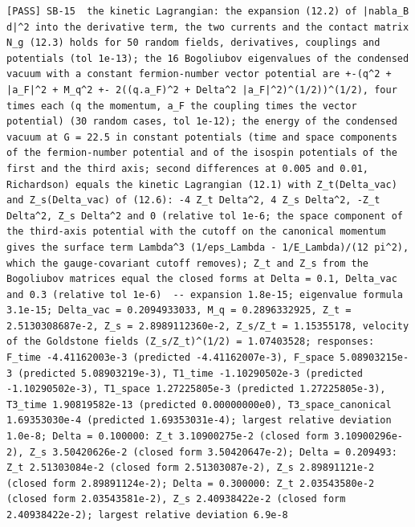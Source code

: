 \documentclass[
  10pt,
]{article}
\begin{document}
\begin{verbatim}
[PASS] SB-15  the kinetic Lagrangian: the expansion (12.2) of |nabla_B d|^2 into the derivative term, the two currents and the contact matrix N_g (12.3) holds for 50 random fields, derivatives, couplings and potentials (tol 1e-13); the 16 Bogoliubov eigenvalues of the condensed vacuum with a constant fermion-number vector potential are +-(q^2 + |a_F|^2 + M_q^2 +- 2((q.a_F)^2 + Delta^2 |a_F|^2)^(1/2))^(1/2), four times each (q the momentum, a_F the coupling times the vector potential) (30 random cases, tol 1e-12); the energy of the condensed vacuum at G = 22.5 in constant potentials (time and space components of the fermion-number potential and of the isospin potentials of the first and the third axis; second differences at 0.005 and 0.01, Richardson) equals the kinetic Lagrangian (12.1) with Z_t(Delta_vac) and Z_s(Delta_vac) of (12.6): -4 Z_t Delta^2, 4 Z_s Delta^2, -Z_t Delta^2, Z_s Delta^2 and 0 (relative tol 1e-6; the space component of the third-axis potential with the cutoff on the canonical momentum gives the surface term Lambda^3 (1/eps_Lambda - 1/E_Lambda)/(12 pi^2), which the gauge-covariant cutoff removes); Z_t and Z_s from the Bogoliubov matrices equal the closed forms at Delta = 0.1, Delta_vac and 0.3 (relative tol 1e-6)  -- expansion 1.8e-15; eigenvalue formula 3.1e-15; Delta_vac = 0.2094933033, M_q = 0.2896332925, Z_t = 2.5130308687e-2, Z_s = 2.8989112360e-2, Z_s/Z_t = 1.15355178, velocity of the Goldstone fields (Z_s/Z_t)^(1/2) = 1.07403528; responses: F_time -4.41162003e-3 (predicted -4.41162007e-3), F_space 5.08903215e-3 (predicted 5.08903219e-3), T1_time -1.10290502e-3 (predicted -1.10290502e-3), T1_space 1.27225805e-3 (predicted 1.27225805e-3), T3_time 1.90819582e-13 (predicted 0.00000000e0), T3_space_canonical 1.69353030e-4 (predicted 1.69353031e-4); largest relative deviation 1.0e-8; Delta = 0.100000: Z_t 3.10900275e-2 (closed form 3.10900296e-2), Z_s 3.50420626e-2 (closed form 3.50420647e-2); Delta = 0.209493: Z_t 2.51303084e-2 (closed form 2.51303087e-2), Z_s 2.89891121e-2 (closed form 2.89891124e-2); Delta = 0.300000: Z_t 2.03543580e-2 (closed form 2.03543581e-2), Z_s 2.40938422e-2 (closed form 2.40938422e-2); largest relative deviation 6.9e-8

\end{verbatim}
\end{document}
